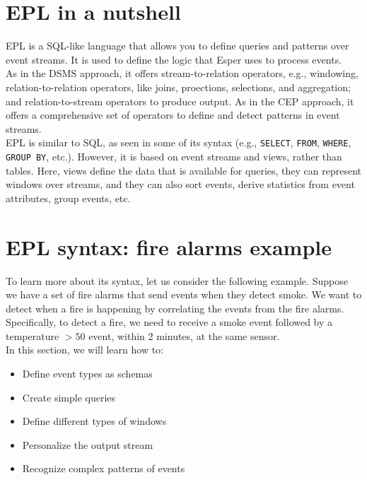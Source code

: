 \section{EPL in a nutshell}

EPL is a SQL-like language that allows you to define queries and patterns over
event streams. It is used to define the logic that Esper uses to process events.\\

As in the DSMS approach, it offers stream-to-relation operators, e.g., windowing, 
relation-to-relation operators, like joins, proections, selections, and aggregation;
and relation-to-stream operators to produce output. As in the CEP approach, it offers 
a comprehensive set of operators to define and detect patterns in event streams.\\

EPL is similar to SQL, as seen in some of its syntax (e.g., \texttt{SELECT}, \texttt{FROM},
\texttt{WHERE}, \texttt{GROUP BY}, etc.). However, it is based on event streams 
and views, rather than tables. Here, views define the data that is available for
queries, they can represent windows over streams, and they can also sort events, derive
statistics from event attributes, group events, etc.

\section{EPL syntax: fire alarms example}

To learn more about its syntax, let us consider the following example. Suppose we have
a set of fire alarms that send events when they detect smoke. We want to detect when a
fire is happening by correlating the events from the fire alarms. Specifically, to 
detect a fire, we need to receive a smoke event followed by a temperature $> 50$ event,
within 2 minutes, at the same sensor.\\

In this section, we will learn how to:

\begin{itemize}
    \item Define event types as schemas
    \item Create simple queries
    \item Define different types of windows
    \item Personalize the output stream
    \item Recognize complex patterns of events
\end{itemize}

